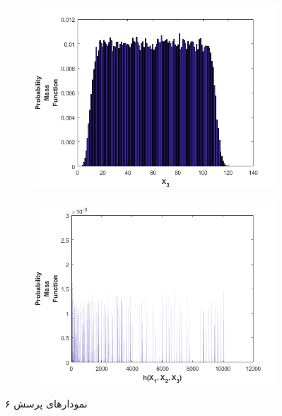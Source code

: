 \documentclass[11pt]{article}
\theoremstyle{definition}
\theoremstyle{lemma}
\theoremstyle{remark}
\begin{document}
\begin{figure}[h!]
		\begin{subfigure}[h!]{0.48\textwidth}
			\includegraphics[width=\textwidth]{./Images/6/3.png}
			\caption{  }
		\end{subfigure}
		\quad
		\begin{subfigure}[h!]{0.48\textwidth}
			\includegraphics[width=\textwidth]{./Images/6/4.png}
			\caption{  }
		\end{subfigure}
		\caption{نمودار‌های پرسش ۶}
		\label{q6}
	\end{figure}
\end{document}
